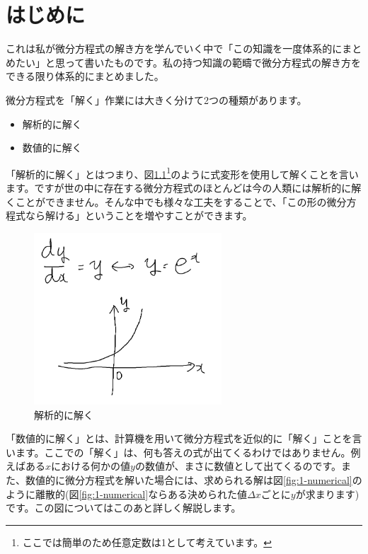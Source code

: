 \chapter{はじめに}
\label{first}

これは私が微分方程式の解き方を学んでいく中で「この知識を一度体系的にまとめたい」と思って書いたものです。私の持つ知識の範疇で微分方程式の解き方をできる限り体系的にまとめました。

微分方程式を「解く」作業には大きく分けて2つの種類があります。

\begin{itemize}
    \item 解析的に解く
    \item 数値的に解く
\end{itemize}

「解析的に解く」とはつまり、図\ref{fig:1-analytical}\footnote{ここでは簡単のため任意定数は1として考えています。}のように式変形を使用して解くことを言います。ですが世の中に存在する微分方程式のほとんどは今の人類には解析的に解くことができません。そんな中でも様々な工夫をすることで、「この形の微分方程式なら解ける」ということを増やすことができます。

\begin{figure}[ht!]
  \centering
  \includegraphics[width=7cm]{img/1-analytical.png}
  \caption{解析的に解く}
  \label{fig:1-analytical}
\end{figure}

「数値的に解く」とは、計算機を用いて微分方程式を近似的に「解く」ことを言います。ここでの「解く」は、何も答えの式が出てくるわけではありません。例えばある$x$における何かの値$y$の数値が、まさに数値として出てくるのです。また、数値的に微分方程式を解いた場合には、求められる解は図\ref{fig:1-numerical}のように離散的(図\ref{fig:1-numerical}ならある決められた値$\Delta x$ごとに$y$が求まります)です。この図についてはこのあと詳しく解説します。

